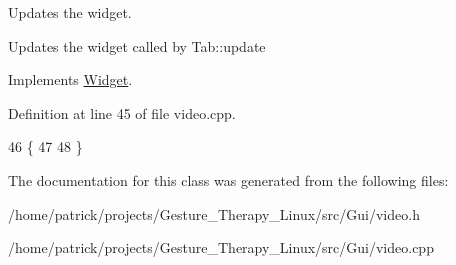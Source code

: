 Updates the widget. 

Updates the widget called by Tab\+::update 

Implements \hyperlink{class_widget_a726dc97add2c6eb82967144207280ace}{Widget}.



Definition at line 45 of file video.\+cpp.


\begin{DoxyCode}
46 \{
47 
48 \}
\end{DoxyCode}


The documentation for this class was generated from the following files\+:\begin{DoxyCompactItemize}
\item 
/home/patrick/projects/\+Gesture\+\_\+\+Therapy\+\_\+\+Linux/src/\+Gui/video.\+h\item 
/home/patrick/projects/\+Gesture\+\_\+\+Therapy\+\_\+\+Linux/src/\+Gui/video.\+cpp\end{DoxyCompactItemize}
